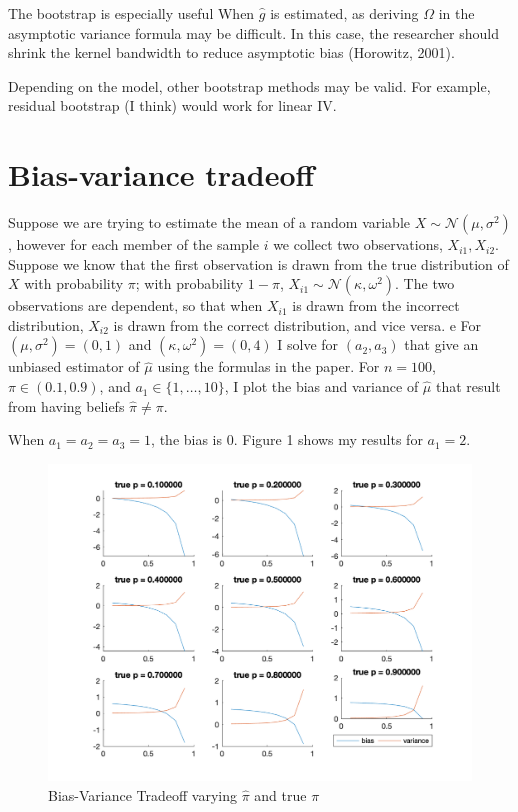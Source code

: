 \documentclass[12pt]{article}
\begin{document}
The bootstrap is especially useful When $\hat{g}$ is estimated, as deriving $\Omega$ in the asymptotic variance formula may be difficult.  In this case, the researcher should shrink the kernel bandwidth to reduce asymptotic bias (Horowitz, 2001).  

Depending on the model, other bootstrap methods may be valid.  For example, residual bootstrap (I think) would work for linear IV. 

\section{Bias-variance tradeoff}

Suppose we are trying to estimate the mean of a random variable $X \sim \mathcal{N}(\mu, \sigma^2)$, however for each member of the sample $i$ we collect two observations, $X_{i1}, X_{i2}$.  Suppose we know that the first observation is drawn from the true distribution of $X$ with probability $\pi$; with probability $1-\pi$, $X_{i1} \sim \mathcal{N}(\kappa, \omega^2)$.  The two observations are dependent, so that when $X_{i1}$ is drawn from the incorrect distribution, $X_{i2}$ is drawn from the correct distribution, and vice versa.
e
For $(\mu, \sigma^2)=(0,1)$ and $(\kappa, \omega^2) = (0,4)$ I solve for $(a_2, a_3)$ that give an  unbiased estimator of $\hat{\mu}$ using the formulas in the paper.  For $n=100$, $\pi \in (0.1, 0.9)$, and $a_1 \in \{1, \dots, 10\}$, I plot the bias and variance of $\hat{\mu}$ that result from having beliefs $\hat{\pi}\neq \pi$.  

When $a_1 = a_2 = a_3 = 1$, the bias is 0. Figure 1 shows my results for $a_1 = 2$.

\begin{figure}[h!]
    \centering
    \caption{Bias-Variance Tradeoff varying $\hat{\pi}$ and true $\pi$}
    \includegraphics[width=\textwidth]{a1_2.png}

    \label{fig:my_label}
\end{figure}
\end{document}
